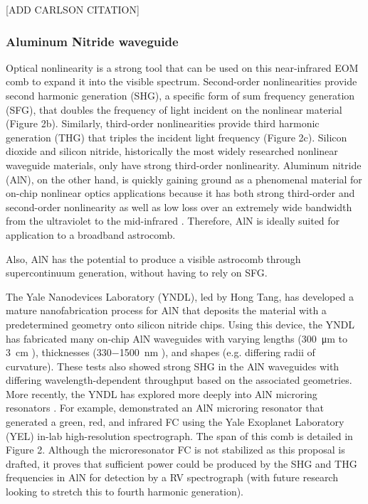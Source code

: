 \documentclass[11pt]{article}
\begin{document}
[ADD CARLSON CITATION]

\subsubsection{Aluminum Nitride waveguide}

Optical nonlinearity is a strong tool that can be used on this near-infrared EOM comb to expand it into the visible spectrum. Second-order nonlinearities provide second harmonic generation (SHG), a specific form of sum frequency generation (SFG), that doubles the frequency of light incident on the nonlinear material (Figure 2b). Similarly, third-order nonlinearities provide third harmonic generation (THG) that triples the incident light frequency (Figure 2c). Silicon dioxide and silicon nitride, historically the most widely researched nonlinear waveguide materials, only have strong third-order nonlinearity. Aluminum nitride (AlN), on the other hand, is quickly gaining ground as a phenomenal material for on-chip nonlinear optics applications because it has both strong third-order and second-order nonlinearity as well as low loss over an extremely wide bandwidth from the ultraviolet to the mid-infrared \cite{Jung2016}. Therefore, AlN is ideally suited for application to a broadband astrocomb.

Also, AlN has the potential to produce a visible astrocomb through supercontinuum generation, without having to rely on SFG.

The Yale Nanodevices Laboratory (YNDL), led by Hong Tang, has developed a mature nanofabrication process for AlN that deposits the material with a predetermined geometry onto silicon nitride chips. Using this device, the YNDL has fabricated many on-chip AlN waveguides with varying lengths (\SI{300}{\micro\meter} to \SI{3}{\centi\meter} \cite{Xiong2012a}), thicknesses (\SI{330-1500}{\nano\meter} \cite{Pernice2012}), and shapes (e.g. differing radii of curvature). These tests also showed strong SHG in the AlN waveguides with differing wavelength-dependent throughput based on the associated geometries. More recently, the YNDL has explored more deeply into AlN microring resonators \cite{Jung2013, Guo2016}. For example, \cite{Jung2014} demonstrated an AlN microring resonator that generated a green, red, and infrared FC using the Yale Exoplanet Laboratory (YEL) in-lab high-resolution spectrograph. The span of this comb is detailed in Figure 2. Although the microresonator FC is not stabilized as this proposal is drafted, it proves that sufficient power could be produced by the SHG and THG frequencies in AlN for detection by a RV spectrograph (with future research looking to stretch this to fourth harmonic generation).
\end{document}
